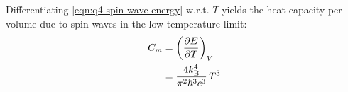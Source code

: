 \begin{parts}
	Differentiating \eqref{eqn:q4-spin-wave-energy} w.r.t. $T$ yields the heat capacity per volume due to spin waves in the low temperature limit:
	\begin{align*}
		C_m &= \left( \frac{\partial E}{\partial T} \right)_{V} \\
		&= \frac{4k_\textnormal{B}^4}{\pi^2 \hbar^3 c^3}\, T^3
	\end{align*}
\end{parts}